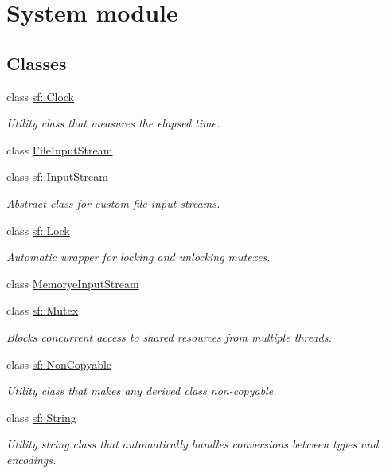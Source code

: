 \hypertarget{group__system}{}\section{System module}
\label{group__system}
\subsection*{Classes}
\begin{DoxyCompactItemize}
\item 
class \hyperlink{classsf_1_1Clock}{sf\+::\+Clock}
\begin{DoxyCompactList}\small\item\em Utility class that measures the elapsed time. \end{DoxyCompactList}\item 
class \hyperlink{classFileInputStream}{File\+Input\+Stream}
\item 
class \hyperlink{classsf_1_1InputStream}{sf\+::\+Input\+Stream}
\begin{DoxyCompactList}\small\item\em Abstract class for custom file input streams. \end{DoxyCompactList}\item 
class \hyperlink{classsf_1_1Lock}{sf\+::\+Lock}
\begin{DoxyCompactList}\small\item\em Automatic wrapper for locking and unlocking mutexes. \end{DoxyCompactList}\item 
class \hyperlink{classMemoryeInputStream}{Memorye\+Input\+Stream}
\item 
class \hyperlink{classsf_1_1Mutex}{sf\+::\+Mutex}
\begin{DoxyCompactList}\small\item\em Blocks concurrent access to shared resources from multiple threads. \end{DoxyCompactList}\item 
class \hyperlink{classsf_1_1NonCopyable}{sf\+::\+Non\+Copyable}
\begin{DoxyCompactList}\small\item\em Utility class that makes any derived class non-\/copyable. \end{DoxyCompactList}\item 
class \hyperlink{classsf_1_1String}{sf\+::\+String}
\begin{DoxyCompactList}\small\item\em Utility string class that automatically handles conversions between types and encodings. \end{DoxyCompactList}\item 

\end{DoxyCompactItemize}

